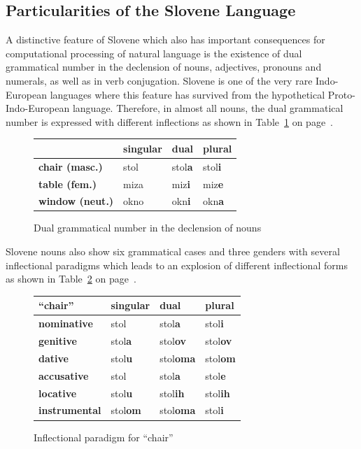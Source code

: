 \begin{multicols}{2}
\subsection{Particularities of the Slovene Language}

A distinctive feature of Slovene which also has important consequences for computational processing of natural language is the existence of dual grammatical number in the declension of nouns, adjectives, pronouns and numerals, as well as in verb conjugation. Slovene is one of the very rare Indo-European languages where this feature has survived from the hypothetical Proto-Indo-European language. Therefore, in almost all nouns, the dual grammatical number is expressed with different inflections as shown in Table~\ref{fig:dual} on page~\pageref{fig:dual}.

\begin{figure}[htb]
\begin{tabularx}{\textwidth}{ |X|X|X|X| }
  \hline
   & \textbf{singular} & \textbf{dual} & \textbf{plural} \\ 
  \hline
  \textbf{chair (masc.)}   & stol     &  stol\textbf{a}  & stol\textbf{i} \\ 
  \hline
  \textbf{table (fem.)}   & miza     &  miz\textbf{i}  & miz\textbf{e} \\ 
  \hline
  \textbf{window (neut.)}   & okno     &  okn\textbf{i}  & okn\textbf{a} \\
  \hline
  \end{tabularx}
  \caption{Dual grammatical number in the declension of nouns}
  \label{fig:dual}
\end{figure}

Slovene nouns also show six grammatical cases and three genders with several inflectional paradigms which leads to an explosion of different inflectional forms as shown in Table~\ref{fig:inflection} on page~\pageref{fig:inflection}.

\begin{figure}[htb]
\begin{tabularx}{\textwidth}{ |X|X|X|X| }
  \hline
  \textbf{``chair''}   & \textbf{singular} & \textbf{dual} & \textbf{plural} \\ 
  \hline
  \textbf{nominative}   & stol     &  stol\textbf{a}  & stol\textbf{i} \\ 
  \hline
  \textbf{genitive}   & stol\textbf{a}    &  stol\textbf{ov}  & stol\textbf{ov} \\ 
  \hline
  \textbf{dative}   & stol\textbf{u}     &  stol\textbf{oma}  & stol\textbf{om} \\ 
  \hline
  \textbf{accusative}   & stol     &  stol\textbf{a}  & stol\textbf{e} \\ 
  \hline
  \textbf{locative}   & stol\textbf{u}     &  stol\textbf{ih}  & stol\textbf{ih} \\ 
  \hline
  \textbf{instrumental}   & stol\textbf{om}     &  stol\textbf{oma}  & stol\textbf{i} \\ 
  \hline
  \end{tabularx}
  \caption{Inflectional paradigm for ``chair''}
  \label{fig:inflection}
\end{figure}


\end{multicols}
